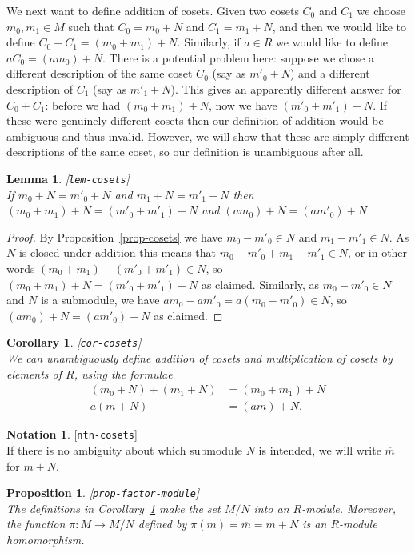 \documentclass{amsart}
\newcommand{\lbl}[1]{\label{#1}\textup{[\texttt{#1}]}\ \\}
\newcommand{\lbl}{\label}
\newcommand{\ov}[1]     {\overline{#1}}
\newcommand{\xra}       {\xrightarrow}
\renewcommand{\:}{\colon}
\newtheorem{lemma}[theorem]{Lemma}
\newtheorem{proposition}[theorem]{Proposition}
\newtheorem{corollary}[theorem]{Corollary}
\theoremstyle{definition}
\newtheorem{notation}[theorem]{Notation}
\begin{document}
We next want to define addition of cosets.  Given two cosets $C_0$ and
$C_1$ we choose $m_0,m_1\in M$ such that $C_0=m_0+N$ and $C_1=m_1+N$,
and then we would like to define $C_0+C_1=(m_0+m_1)+N$.  Similarly, if
$a\in R$ we would like to define $aC_0=(am_0)+N$.  There is a
potential problem here: suppose we chose a different description of
the same coset $C_0$ (say as $m'_0+N$) and a different description of
$C_1$ (say as $m'_1+N$).  This gives an apparently different answer
for $C_0+C_1$: before we had $(m_0+m_1)+N$, now we have
$(m'_0+m'_1)+N$.  If these were genuinely different cosets then our
definition of addition would be ambiguous and thus invalid.  However,
we will show that these are simply different descriptions of the same
coset, so our definition is unambiguous after all.
\begin{lemma}\lbl{lem-cosets}
 If $m_0+N=m'_0+N$ and $m_1+N=m'_1+N$ then $(m_0+m_1)+N=(m'_0+m'_1)+N$
 and $(am_0)+N=(am'_0)+N$.
\end{lemma}
\begin{proof}
 By Proposition~\ref{prop-cosets} we have $m_0-m'_0\in N$ and
 $m_1-m'_1\in N$.  As $N$ is closed under addition this means that
 $m_0-m'_0+m_1-m'_1\in N$, or in other words
 $(m_0+m_1)-(m'_0+m'_1)\in N$, so $(m_0+m_1)+N=(m'_0+m'_1)+N$ as
 claimed.  Similarly, as $m_0-m'_0\in N$ and $N$ is a submodule, we
 have $am_0-am'_0=a(m_0-m'_0)\in N$, so $(am_0)+N=(am'_0)+N$ as
 claimed.
\end{proof}
\begin{corollary}\lbl{cor-cosets}
 We can unambiguously define addition of cosets and multiplication of
 cosets by elements of $R$, using the formulae
 \begin{align*}
  (m_0+N) + (m_1+N) &= (m_0+m_1) + N \\
  a(m+N) &= (am) + N.
 \end{align*}
\end{corollary}
\begin{notation}\lbl{ntn-cosets}
 If there is no ambiguity about which submodule $N$ is intended, we
 will write $\ov{m}$ for $m+N$.
\end{notation}
\begin{proposition}\lbl{prop-factor-module}
 The definitions in Corollary~\ref{cor-cosets} make the set $M/N$ into
 an $R$-module.  Moreover, the function $\pi\:M\xra{}M/N$ defined by
 $\pi(m)=\ov{m}=m+N$ is an $R$-module homomorphism.
\end{proposition}
\end{document}
